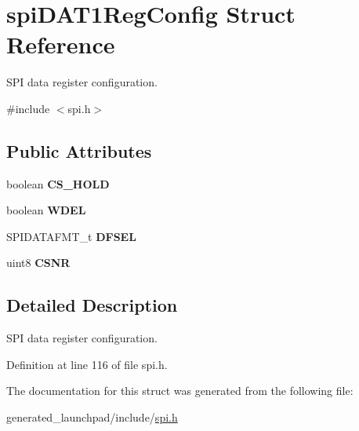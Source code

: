 \hypertarget{structspiDAT1RegConfig}{}\section{spi\+D\+A\+T1\+Reg\+Config Struct Reference}
\label{structspiDAT1RegConfig}


S\+PI data register configuration.  




{\ttfamily \#include $<$spi.\+h$>$}

\subsection*{Public Attributes}
\begin{DoxyCompactItemize}
\item 
\mbox{\label{structspiDAT1RegConfig_a408e72cbc6e94687115af3c59054074b}} 
boolean {\bfseries C\+S\+\_\+\+H\+O\+LD}
\item 
\mbox{\label{structspiDAT1RegConfig_a5aaa1afc0b17311e3067b0bc8199b023}} 
boolean {\bfseries W\+D\+EL}
\item 
\mbox{\label{structspiDAT1RegConfig_a49bc387f3d53391904be5a37b3513cee}} 
S\+P\+I\+D\+A\+T\+A\+F\+M\+T\+\_\+t {\bfseries D\+F\+S\+EL}
\item 
\mbox{\label{structspiDAT1RegConfig_a7ba05ca01fe55b1bc6489da7f5990715}} 
uint8 {\bfseries C\+S\+NR}
\end{DoxyCompactItemize}


\subsection{Detailed Description}
S\+PI data register configuration. 

Definition at line 116 of file spi.\+h.



The documentation for this struct was generated from the following file\+:\begin{DoxyCompactItemize}
\item 
generated\+\_\+launchpad/include/\mbox{\hyperlink{spi_8h}{spi.\+h}}\end{DoxyCompactItemize}
